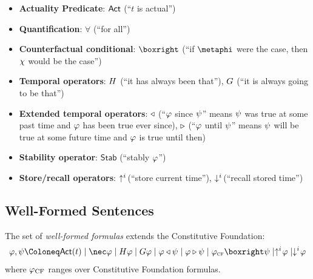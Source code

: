 \documentclass[../LogosReference.tex]{subfiles}
\begin{document}
\begin{itemize}
    \item \textbf{Actuality Predicate}: $\mathsf{Act}$ (``$t$ is actual'')
    \item \textbf{Quantification}: $\forall$ (``for all'')
    \item \textbf{Counterfactual conditional}: $\boxright$ (``if $\metaphi$ were the case, then $\chi$ would be the case'')
    \item \textbf{Temporal operators}: $H$ (``it has always been that''), $G$ (``it is always going to be that'')
    \item \textbf{Extended temporal operators}: $\triangleleft$ (``$\varphi$ since $\psi$'' means $\psi$ was true at some past time and $\varphi$ has been true ever since), $\triangleright$ (``$\varphi$ until $\psi$'' means $\psi$ will be true at some future time and $\varphi$ is true until then)
    \item \textbf{Stability operator}: $\mathsf{Stab}$ (``stably $\varphi$'')
    \item \textbf{Store/recall operators}: $\uparrow^{i}\hspace{-2pt}$ (``store current time''), $\downarrow^{i}\hspace{-2pt}$ (``recall stored time'')
\end{itemize}


\subsection{Well-Formed Sentences}\label{sec:well-formed-sentences}


\begin{definition}\label{def:wff-dynamics}
The set of \emph{well-formed formulas} extends the Constitutive Foundation:
  \[
    \metaA, \metaB \Define
      \actual(t) \mid
      \nec\metaA \mid
      \allpast\metaA \mid
      \allfuture\metaA \mid
      \metaA \since \metaB \mid
      \metaA \until \metaB \mid
      \metaA_\textsc{cf} \boxright \metaB \mid
      \store{i}\metaA \mid
      \recall{i}\metaA
  \]
where $\varphi_\text{CF}$ ranges over Constitutive Foundation formulas.
\end{definition}
\end{document}
